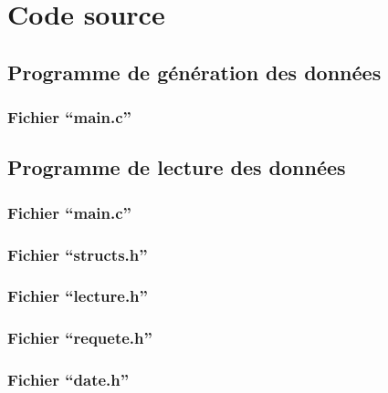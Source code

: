 \section{Code source}

\subsection{Programme de génération des données}

\subsubsection{Fichier ``main.c''}


\subsection{Programme de lecture des données}

\subsubsection{Fichier ``main.c''}


\subsubsection{Fichier ``structs.h''}


\subsubsection{Fichier ``lecture.h''}


\subsubsection{Fichier ``requete.h''}


\subsubsection{Fichier ``date.h''}
